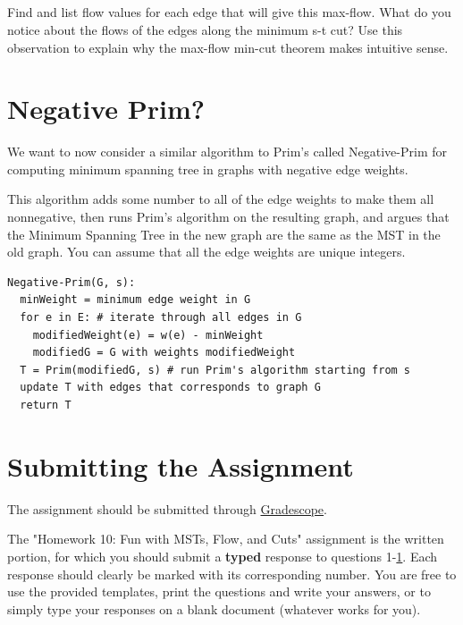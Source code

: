 \documentclass [12pt]{article}
\begin{document}


\subsection{}

Find and list flow values for each edge that will give this max-flow. What do you notice about the flows of the edges along the minimum s-t cut? Use this observation to explain why the max-flow min-cut theorem makes intuitive sense.



\pagebreak
\section{Negative Prim? }
\label{sec:last}
We want to now consider a similar algorithm to Prim's called Negative-Prim for computing minimum spanning tree in graphs with negative edge weights.

This algorithm adds some number to all of the edge weights to make them all nonnegative, then runs Prim's algorithm on the resulting graph, and argues that the Minimum Spanning Tree in the new graph are the same as the MST in the old graph. You can assume that all the edge weights are unique integers.

\begin{verbatim}
Negative-Prim(G, s):
  minWeight = minimum edge weight in G
  for e in E: # iterate through all edges in G
    modifiedWeight(e) = w(e) - minWeight
    modifiedG = G with weights modifiedWeight
  T = Prim(modifiedG, s) # run Prim's algorithm starting from s
  update T with edges that corresponds to graph G
  return T
\end{verbatim}



\section*{Submitting the Assignment}

The assignment should be submitted through \href{https://www.gradescope.com/courses/350304}{Gradescope}.

The "Homework 10: Fun with MSTs, Flow, and Cuts" assignment is the written portion, for which you should submit a \textbf{typed} response to questions 1-\ref{sec:last}. Each response should clearly be marked with its corresponding number. You are free to use the provided templates, print the questions and write your answers, or to simply type your responses on a blank document (whatever works for you).
\end{document}
